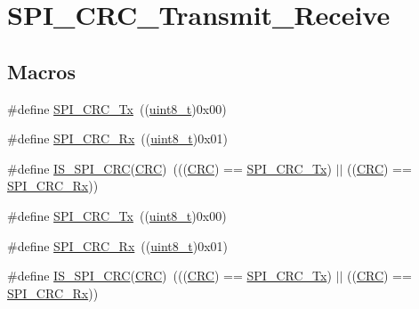 \hypertarget{group___s_p_i___c_r_c___transmit___receive}{}\section{S\+P\+I\+\_\+\+C\+R\+C\+\_\+\+Transmit\+\_\+\+Receive}
\label{group___s_p_i___c_r_c___transmit___receive}
\subsection*{Macros}
\begin{DoxyCompactItemize}
\item 
\#define \hyperlink{group___s_p_i___c_r_c___transmit___receive_ga7b5cd97c9323e491b628fd3a7be9e133}{S\+P\+I\+\_\+\+C\+R\+C\+\_\+\+Tx}~((\hyperlink{_p_e___types_8h_aba7bc1797add20fe3efdf37ced1182c5}{uint8\+\_\+t})0x00)
\item 
\#define \hyperlink{group___s_p_i___c_r_c___transmit___receive_gaf68380273616efbbc2dc9a420f1c641b}{S\+P\+I\+\_\+\+C\+R\+C\+\_\+\+Rx}~((\hyperlink{_p_e___types_8h_aba7bc1797add20fe3efdf37ced1182c5}{uint8\+\_\+t})0x01)
\item 
\#define \hyperlink{group___s_p_i___c_r_c___transmit___receive_ga31fe242594f851558496a93f85def883}{I\+S\+\_\+\+S\+P\+I\+\_\+\+C\+RC}(\hyperlink{group___peripheral__declaration_ga4381bb54c2dbc34500521165aa7b89b1}{C\+RC})~(((\hyperlink{group___peripheral__declaration_ga4381bb54c2dbc34500521165aa7b89b1}{C\+RC}) == \hyperlink{openmotestm_2library_2inc_2stm32f10x__spi_8h_a7b5cd97c9323e491b628fd3a7be9e133}{S\+P\+I\+\_\+\+C\+R\+C\+\_\+\+Tx}) $\vert$$\vert$ ((\hyperlink{group___peripheral__declaration_ga4381bb54c2dbc34500521165aa7b89b1}{C\+RC}) == \hyperlink{openmotestm_2library_2inc_2stm32f10x__spi_8h_af68380273616efbbc2dc9a420f1c641b}{S\+P\+I\+\_\+\+C\+R\+C\+\_\+\+Rx}))
\item 
\#define \hyperlink{group___s_p_i___c_r_c___transmit___receive_ga7b5cd97c9323e491b628fd3a7be9e133}{S\+P\+I\+\_\+\+C\+R\+C\+\_\+\+Tx}~((\hyperlink{_p_e___types_8h_aba7bc1797add20fe3efdf37ced1182c5}{uint8\+\_\+t})0x00)
\item 
\#define \hyperlink{group___s_p_i___c_r_c___transmit___receive_gaf68380273616efbbc2dc9a420f1c641b}{S\+P\+I\+\_\+\+C\+R\+C\+\_\+\+Rx}~((\hyperlink{_p_e___types_8h_aba7bc1797add20fe3efdf37ced1182c5}{uint8\+\_\+t})0x01)
\item 
\#define \hyperlink{group___s_p_i___c_r_c___transmit___receive_ga31fe242594f851558496a93f85def883}{I\+S\+\_\+\+S\+P\+I\+\_\+\+C\+RC}(\hyperlink{group___peripheral__declaration_ga4381bb54c2dbc34500521165aa7b89b1}{C\+RC})~(((\hyperlink{group___peripheral__declaration_ga4381bb54c2dbc34500521165aa7b89b1}{C\+RC}) == \hyperlink{openmotestm_2library_2inc_2stm32f10x__spi_8h_a7b5cd97c9323e491b628fd3a7be9e133}{S\+P\+I\+\_\+\+C\+R\+C\+\_\+\+Tx}) $\vert$$\vert$ ((\hyperlink{group___peripheral__declaration_ga4381bb54c2dbc34500521165aa7b89b1}{C\+RC}) == \hyperlink{openmotestm_2library_2inc_2stm32f10x__spi_8h_af68380273616efbbc2dc9a420f1c641b}{S\+P\+I\+\_\+\+C\+R\+C\+\_\+\+Rx}))
\end{DoxyCompactItemize}



